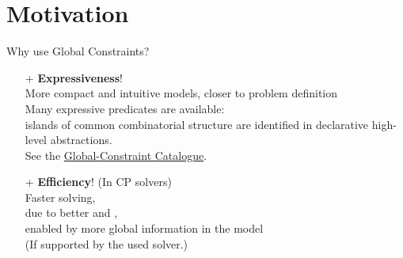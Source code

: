 \documentclass{cons-beamer}
\begin{document}
\section{Motivation}

\begin{frame}{Why use Global Constraints?} 
  \begin{itemize}
    \item[+] \textbf{Expressiveness}! \\ 
      More compact and intuitive models, closer to problem definition \\ 
      Many expressive predicates are available: \\
      islands of common combinatorial structure are identified in declarative high-level abstractions. \\
      See the \href{https://sofdem.github.io/gccat}{Global-Constraint Catalogue}.
      \vfill 

    \item[+] \textbf{Efficiency}! (In CP solvers) \\
      Faster solving, \\
      due to better  and , \\
      enabled by more global information in the model \\
      (If supported by the used solver.)
  \end{itemize}
\end{frame}
\end{document}
